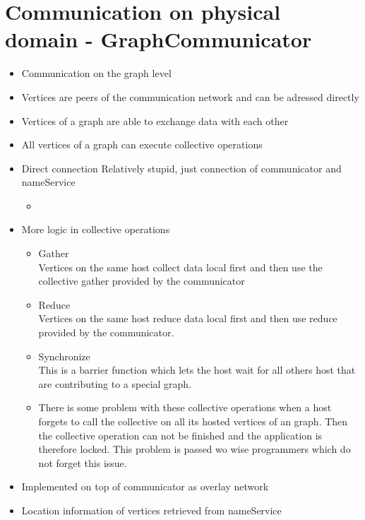\section{Communication on physical domain - GraphCommunicator}

\begin{itemize}
\item Communication on the graph level
\item Vertices are peers of the communication network and can be adressed directly
\item Vertices of a graph are able to exchange data with each other
\item All vertices of a graph can execute collective operations

\item Direct connection Relatively stupid, just connection of communicator and nameService
\begin{itemize}
\item 
\end{itemize}

\item More logic in collective operations
  \begin{itemize}
    \item Gather\\
      Vertices on the same host collect data local first and then use
      the collective gather provided by the communicator
    \item Reduce\\
      Vertices on the same host reduce data local first and then use
      reduce provided by the communicator.
    \item Synchronize\\
      This is a barrier function which lets the host wait for all others host
      that are contributing to a special graph. 
    \item There is some problem with these collective operations when a host
      forgets to call the collective on all its hosted vertices of an graph.
      Then the collective operation can not be finished and the application 
      is therefore locked. This problem is passed wo wise programmers which
      do not forget this issue.
  \end{itemize}
  

\item Implemented on top of communicator as overlay network
\item Location information of vertices retrieved from nameService
\end{itemize}



